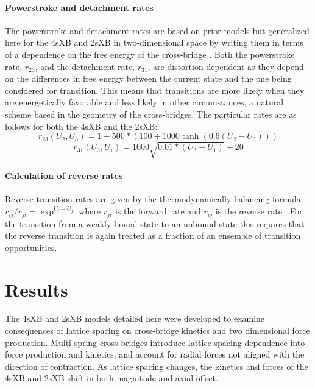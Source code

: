 \documentclass[]{article}
\begin{document}
\paragraph{Powerstroke and detachment rates} %
The powerstroke and detachment rates are based on prior models but  generalized here for the 4sXB and 2sXB in two-dimensional space by writing them in terms of a dependence on the free energy of the cross-bridge  \citep{Pate1989, Tanner2007}. 
Both the powerstroke rate, $r_{23}$, and the detachment rate, $r_{31}$, are distortion dependent as they depend on the differences in free energy between the current state and the one being considered for transition. 
This means that transitions are more likely when they are energetically favorable and less likely in other circumstances, a natural scheme based in the geometry of the cross-bridges.
The particular rates are as follows for both the 4sXB and the 2sXB: %
$$r_{23}(U_2, U_3) = 1 + 500 * (100 + 1000 \tanh(0.6 (U_2 - U_3))) $$
$$r_{31}(U_3, U_1) = 1000\sqrt{0.01 *  (U_3 - U_1)} + 20$$

\paragraph{Calculation of reverse rates} %
Reverse transition rates are given by the thermodynamically balancing formula $r_{ij}/r_{ji}=\exp^{U_i-U_j}$ where $r_{ji}$ is the forward rate and $r_{ij}$ is the reverse rate \citep{Pate1989, Daniel1998, Tanner2007}.
For the transition from a weakly bound state to an unbound state this requires that the reverse transition is again treated as a fraction of an ensemble of transition opportunities. 



\section{Results} %

The 4sXB and 2sXB models detailed here were developed to examine consequences of lattice spacing on cross-bridge kinetics and two dimensional force production.
Multi-spring cross-bridges introduce lattice spacing dependence into force production and kinetics, and account for radial forces not aligned with the direction of contraction. 
As lattice spacing changes, the kinetics and forces of the 4sXB and 2sXB shift in both magnitude and axial offset.
\end{document}

